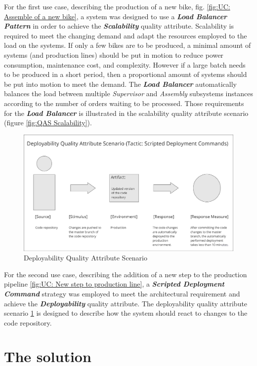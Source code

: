 \documentclass[conference]{IEEEtran}
\begin{document}
For the first use case, describing the production of a new bike, fig. \ref{fig:UC: Assemble of a new bike},
a system was designed to use a \textbf{\textit{Load Balancer Pattern}} in order to achieve the \textbf{\textit{Scalability}} quality attribute. Scalability is required to meet the changing demand and adapt the resources employed to the load on the systems. If only a few bikes are to be produced, a minimal amount of systems (and production lines) should be put in motion to reduce power consumption, maintenance cost, and complexity. However if a large batch needs to be produced in a short period, then a proportional amount of systems should be put into motion to meet the demand. The \textbf{\textit{Load Balancer}} automatically balances the load between multiple \textit{Supervisor} and \textit{Assembly} subsystems instances according to the number of orders waiting to be processed. Those requirements for the \textit{\textbf{Load Balancer}} is illustrated in the scalability quality attribute scenario (figure \ref{fig:QAS Scalability}).

\begin{figure}
    \centering
    \includegraphics[width=0.9\linewidth]{img/QAS Deployability.png}
    \caption{Deployability Quality Attribute Scenario}
    \label{fig:QAS Deployability}
\end{figure}

For the second use case, describing the addition of a new step to the production pipeline \ref{fig:UC: New step to production line}, a \textbf{\textit{Scripted Deployment Command}} strategy was employed to meet the architectural requirement and achieve the \textbf{\textit{Deployability}} quality attribute. 
The deployability quality attribute scenario \ref{fig:QAS Deployability} is designed to describe how the system should react to changes to the code repository. 

\section{The solution}
\label{sec:middleware_architecture}
\end{document}
